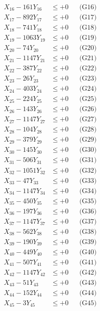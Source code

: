 \documentclass[a4paper,10pt]{article}
\begin{document}
{\begin{align}
X_{16} - 161Y_{16} &\leq +0 && \text{(G16)} \\
X_{17} - 892Y_{17} &\leq +0 && \text{(G17)} \\
X_{18} - 741Y_{18} &\leq +0 && \text{(G18)} \\
X_{19} - 1063Y_{19} &\leq +0 && \text{(G19)} \\
X_{20} - 74Y_{20} &\leq +0 && \text{(G20)} \\
\allowbreak
X_{21} - 1147Y_{21} &\leq +0 && \text{(G21)} \\
X_{22} - 387Y_{22} &\leq +0 && \text{(G22)} \\
X_{23} - 26Y_{23} &\leq +0 && \text{(G23)} \\
X_{24} - 403Y_{24} &\leq +0 && \text{(G24)} \\
X_{25} - 224Y_{25} &\leq +0 && \text{(G25)} \\
X_{26} - 143Y_{26} &\leq +0 && \text{(G26)} \\
X_{27} - 1147Y_{27} &\leq +0 && \text{(G27)} \\
X_{28} - 104Y_{28} &\leq +0 && \text{(G28)} \\
X_{29} - 379Y_{29} &\leq +0 && \text{(G29)} \\
X_{30} - 145Y_{30} &\leq +0 && \text{(G30)} \\
\allowbreak
X_{31} - 506Y_{31} &\leq +0 && \text{(G31)} \\
X_{32} - 1051Y_{32} &\leq +0 && \text{(G32)} \\
X_{33} - 47Y_{33} &\leq +0 && \text{(G33)} \\
X_{34} - 1147Y_{34} &\leq +0 && \text{(G34)} \\
X_{35} - 450Y_{35} &\leq +0 && \text{(G35)} \\
X_{36} - 197Y_{36} &\leq +0 && \text{(G36)} \\
X_{37} - 1147Y_{37} &\leq +0 && \text{(G37)} \\
X_{38} - 562Y_{38} &\leq +0 && \text{(G38)} \\
X_{39} - 190Y_{39} &\leq +0 && \text{(G39)} \\
X_{40} - 449Y_{40} &\leq +0 && \text{(G40)} \\
\allowbreak
X_{41} - 507Y_{41} &\leq +0 && \text{(G41)} \\
X_{42} - 1147Y_{42} &\leq +0 && \text{(G42)} \\
X_{43} - 51Y_{43} &\leq +0 && \text{(G43)} \\
X_{44} - 152Y_{44} &\leq +0 && \text{(G44)} \\
X_{45} - 3Y_{45} &\leq +0 && \text{(G45)} \\

\end{align}}
\end{document}
